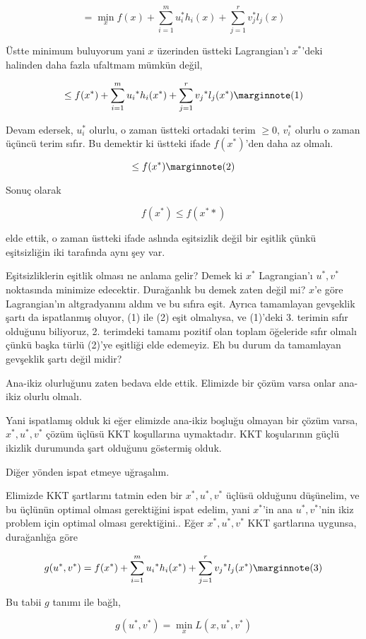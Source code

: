 \documentclass[12pt,fleqn]{article}\usepackage{../../common}
\begin{document}
$$
= \min_x f(x) + \sum_{i=1}^{m} u_i^* h_i(x) + \sum_{j=1}^{r} v_j^* l_j(x) 
$$
 
Üstte minimum buluyorum yani $x$ üzerinden üstteki Lagrangian'ı $x^*$'deki
halinden daha fazla ufaltmam mümkün değil,

$$
\le f(x^*) + \sum_{i=1}^{m} u_i{^*} h_i(x^*) + \sum_{j=1}^{r} v_j{^*} l_j(x^*) 
\mlabel{1}
$$

Devam edersek, $u_i^*$ olurlu, o zaman üstteki ortadaki terim $\ge 0$,
$v_i^*$ olurlu o zaman üçüncü terim sıfır. Bu demektir ki üstteki ifade
$f(x^*)$'den daha az olmalı.

$$
\le f(x^*) 
\mlabel{2}
$$

Sonuç olarak 

$$
f(x^*) \le f(x^**)
$$

elde ettik, o zaman üstteki ifade aslında eşitsizlik değil bir eşitlik
çünkü eşitsizliğin iki tarafında aynı şey var. 

Eşitsizliklerin eşitlik olması ne anlama gelir? Demek ki $x^*$ Lagrangian'ı
$u^*,v^*$ noktasında minimize edecektir. Durağanlık bu demek zaten değil
mi? $x$'e göre Lagrangian'ın altgradyanını aldım ve bu sıfıra eşit.  Ayrıca
tamamlayan gevşeklik şartı da ispatlanmış oluyor, (1) ile (2) eşit
olmalıysa, ve (1)'deki 3. terimin sıfır olduğunu biliyoruz, 2. terimdeki
tamamı pozitif olan toplam öğeleride sıfır olmalı çünkü başka türlü (2)'ye
eşitliği elde edemeyiz. Eh bu durum da tamamlayan gevşeklik şartı değil
midir?

Ana-ikiz olurluğunu zaten bedava elde ettik. Elimizde bir çözüm varsa onlar
ana-ikiz olurlu olmalı. 

Yani ispatlamış olduk ki eğer elimizde ana-ikiz boşluğu olmayan bir çözüm
varsa, $x^*,u^*,v^*$ çözüm üçlüsü KKT koşullarına uymaktadır. KKT
koşularının güçlü ikizlik durumunda şart olduğunu göstermiş olduk.

Diğer yönden ispat etmeye uğraşalım. 

Elimizde KKT şartlarını tatmin eden bir $x^*,u^*,v^*$ üçlüsü olduğunu
düşünelim, ve bu üçlünün optimal olması gerektiğini ispat edelim, yani
$x^*$'in ana $u^*,v^*$'nin ikiz problem için optimal olması
gerektiğini.. Eğer $x^*,u^*,v^*$ KKT şartlarına uygunsa, durağanlığa göre

$$
g(u^*,v^*) = f(x^*) + \sum_{i=1}^{m} u_i{^*} h_i(x^*) + \sum_{j=1}^{r} v_j{^*} l_j(x^*) 
\mlabel{3}
$$

Bu tabii $g$ tanımı ile bağlı,

$$
g(u^*,v^*) = \min_x L(x,u^*,v^*)
$$
\end{document}
